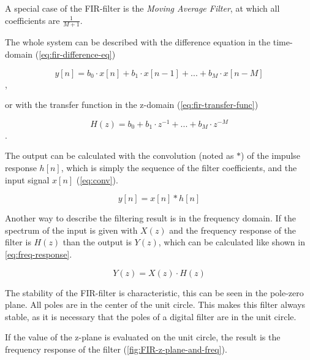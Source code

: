 A special case of the \ac{FIR}-filter is the \textit{Moving Average Filter}, at which all coefficients are $\frac{1}{M+1}$.

The whole system can be described with the difference equation in the time-domain (\autoref{eq:fir-difference-eq})

\begin{equation}
    y[n] = b_0 \cdot x[n] + b_1 \cdot x[n-1] + ... + b_M \cdot x[n-M]
    \label{eq:fir-difference-eq}
\end{equation},

or with the transfer function in the z-domain (\autoref{eq:fir-transfer-func})

\begin{equation}
    H(z) = b_0 + b_1 \cdot z^{-1} + ... + b_M \cdot z^{-M}
    \label{eq:fir-transfer-func}
\end{equation}.

The output can be calculated with the convolution (noted as $*$) of the impulse response $h[n]$, which is simply the
sequence of the filter coefficients, and the input signal $x[n]$ (\autoref{eq:conv}).

\begin{equation}
    y[n] = x[n] * h[n]
    \label{eq:conv}
\end{equation}

Another way to describe the filtering result is in the frequency domain.
If the spectrum of the input is given with $X(z)$ and the frequency response of the filter is $H(z)$
than the output is $Y(z)$, which can be calculated like shown in \autoref{eq:freq-response}.

\begin{equation}
    Y(z) = X(z) \cdot H(z)
    \label{eq:freq-response}
\end{equation}

The stability of the \ac{FIR}-filter is characteristic, this can be seen in the pole-zero plane. All poles are in
the center of the unit circle. This makes this filter always stable, as it is necessary that the poles of a digital
filter are in the unit circle.

If the value of the z-plane is evaluated on the unit circle, the result is the frequency response of the filter
(\autoref{fig:FIR-z-plane-and-freq}).

